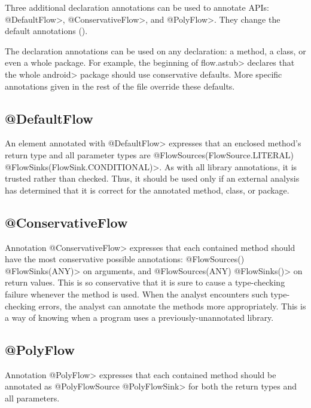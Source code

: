 Three additional declaration annotations can be used to annotate APIs:
\<@DefaultFlow>, \<@ConservativeFlow>, and \<@PolyFlow>. 
They change the default annotations ().
 
The declaration annotations can be used on any declaration: a method,
a class, or even a whole package.
For example, the beginning of \<flow.astub> declares that the
whole \<android> package should use conservative defaults.
More specific annotations given in the rest of the file override these
defaults.


\subsection{@DefaultFlow}

An element annotated with \<@DefaultFlow> expresses that an enclosed
method's return type and all parameter types are \<@FlowSources(FlowSource.LITERAL)
@FlowSinks(FlowSink.CONDITIONAL)>.  As with all 
library annotations, it is trusted rather than checked.  Thus, it should be
used only if an external analysis has determined that it is correct for the
annotated method, class, or package.




\subsection{@ConservativeFlow}

Annotation \<@ConservativeFlow> expresses that each contained method
should have the most conservative possible annotations:
  \<@FlowSources({}) @FlowSinks(ANY)> on arguments, and
  \<@FlowSources(ANY) @FlowSinks({})> on return values.
This is so conservative that it is sure to cause a type-checking failure
whenever the method is used.
When the analyst encounters such type-checking errors, the analyst can
annotate the methods more appropriately.  This is a way of knowing when a
program uses a previously-unannotated library.


\subsection{@PolyFlow\label{sec:polyflow}}

Annotation \<@PolyFlow> expresses that each contained method should be
annotated as \<@PolyFlowSource @PolyFlowSink> for both the return
types and all parameters.



